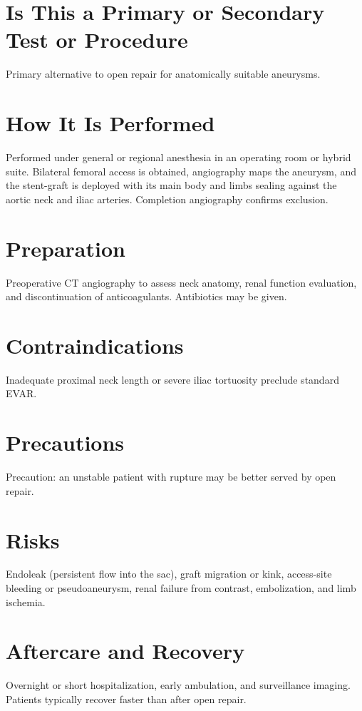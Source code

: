 \section*{Is This a Primary or Secondary Test or Procedure}
Primary alternative to open repair for anatomically suitable aneurysms.

\section*{How It Is Performed}
Performed under general or regional anesthesia in an operating room or hybrid suite. Bilateral femoral access is obtained, angiography maps the aneurysm, and the stent-graft is deployed with its main body and limbs sealing against the aortic neck and iliac arteries. Completion angiography confirms exclusion.

\section*{Preparation}
Preoperative CT angiography to assess neck anatomy, renal function evaluation, and discontinuation of anticoagulants. Antibiotics may be given.

\section*{Contraindications}
Inadequate proximal neck length or severe iliac tortuosity preclude standard EVAR.

\section*{Precautions}
Precaution: an unstable patient with rupture may be better served by open repair.

\section*{Risks}
Endoleak (persistent flow into the sac), graft migration or kink, access-site bleeding or pseudoaneurysm, renal failure from contrast, embolization, and limb ischemia.

\section*{Aftercare and Recovery}
Overnight or short hospitalization, early ambulation, and surveillance imaging. Patients typically recover faster than after open repair.

